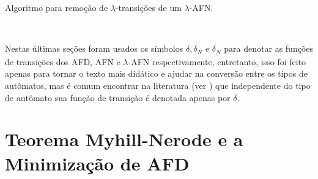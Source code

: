 \begin{algorithm}[h]
	\caption{Algoritmo para remoção de $\lambda$-transições de um $\lambda$-AFN.}
	\label{alg:LAFN-AFD}
\end{algorithm}

\

\begin{note}
	Nestas últimas seções foram usados os símbolos $\delta, \delta_N$ e $\underline{\delta_N}$ para denotar as funções de transições dos AFD, AFN e $\lambda$-AFN respectivamente, entretanto, isso foi feito apenas para tornar o texto mais didático e ajudar na conversão entre os tipos de autômatos, mas é comum encontrar na literatura (ver \cite{benjaLivro2010, hopcroft2008, linz2006}) que independente do tipo de autômato sua função de transição é denotada apenas por $\delta$.
\end{note}

\section{Teorema Myhill-Nerode e a Minimização de AFD}\label{sec:Minimizacao}


